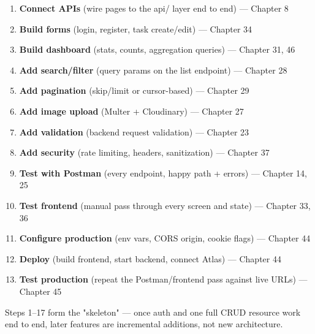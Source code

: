 \begin{enumerate}
\item \textbf{Connect APIs} (wire pages to the api/ layer end to end) --- Chapter 8
\item \textbf{Build forms} (login, register, task create/edit) --- Chapter 34
\item \textbf{Build dashboard} (stats, counts, aggregation queries) --- Chapter 31, 46
\item \textbf{Add search/filter} (query params on the list endpoint) --- Chapter 28
\item \textbf{Add pagination} (skip/limit or cursor-based) --- Chapter 29
\item \textbf{Add image upload} (Multer + Cloudinary) --- Chapter 27
\item \textbf{Add validation} (backend request validation) --- Chapter 23
\item \textbf{Add security} (rate limiting, headers, sanitization) --- Chapter 37
\item \textbf{Test with Postman} (every endpoint, happy path + errors) --- Chapter 14, 25
\item \textbf{Test frontend} (manual pass through every screen and state) --- Chapter 33, 36
\item \textbf{Configure production} (env vars, CORS origin, cookie flags) --- Chapter 44
\item \textbf{Deploy} (build frontend, start backend, connect Atlas) --- Chapter 44
\item \textbf{Test production} (repeat the Postman/frontend pass against live URLs) --- Chapter 45
\end{enumerate}

\begin{tipbox}[TIP]
Steps 1--17 form the "skeleton" --- once auth and one full CRUD resource work end to end, later features are incremental additions, not new architecture.
\end{tipbox}
